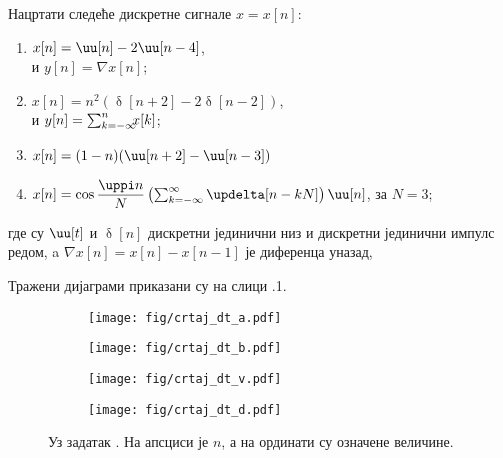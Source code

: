 \PID
Нацртати следеће
дискретне сигнале $x=x[n]$:
\begin{multicols}{2}
\begin{enumerate}[label=(\alph*)]
\item $x[n] = \uu[n] - 2\uu[n-4]$, \\ и 
$y[n] = \nabla x[n]$;
\item $x[n] = n^2( \updelta[n+2] - 2\updelta[n-2] )$, \\ и 
$y[n] = \sum_{k = -\infty}^n \hspace*{-0.5em}
 x[k]$;
\item $x[n] = (1-n)(\uu[n+2] - \uu[n-3])$
\item  $x[n] = \cos\dfrac{\uppi n}{N}  
\left(
\sum_{k = -\infty}^{\infty} \updelta[n-kN]
\right)  \uu[n] $, за $N = 3$;
\end{enumerate}
\end{multicols}
\noindent
где су $\uu[t]$ и $\updelta[n]$ дискретни 
јединични низ
и дискретни јединични импулс редом, a $\nabla x[n] = x[n] - x[n-1]$ је диференца уназад,
\vspace*{5mm}

\REZULTAT  
Тражени дијаграми приказани су 
на слици \ID.1. \\
\begin{figure}[ht!]
    \hspace*{0pt}\hfill
    \begin{subfigure}[c]{0.45\textwidth}
        \centering
        \texttt{[image: fig/crtaj\_dt\_a.pdf]}
        \caption{}
    \end{subfigure}
    \hspace*{0pt}\hfill
    \begin{subfigure}[c]{0.45\textwidth}
        \centering
        \texttt{[image: fig/crtaj\_dt\_b.pdf]}
        \caption{}
    \end{subfigure}
    \hfill
    \hspace*{0pt}

    \hspace*{0pt}\hfill
    \begin{subfigure}[c]{0.45\textwidth}
        \centering
        \texttt{[image: fig/crtaj\_dt\_v.pdf]}
        \caption{}
    \end{subfigure}
    \hspace*{0pt}\hfill
    \begin{subfigure}[c]{0.45\textwidth}
        \centering
        \texttt{[image: fig/crtaj\_dt\_d.pdf]}
        \caption{}
    \end{subfigure}
    \hfill
    \hspace*{0pt}
    \caption{Уз задатак \ID. На апсциси је $n$, а на ординати су означене величине.}
\end{figure}